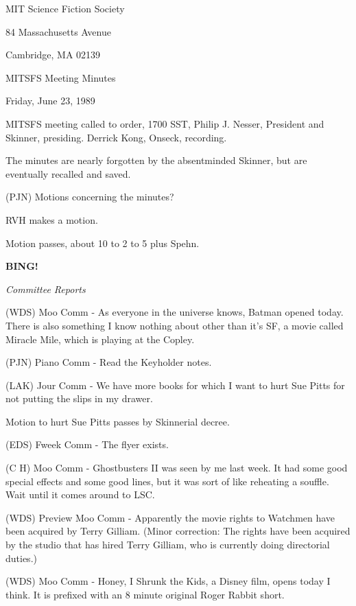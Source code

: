 \documentclass[12pt]{article}
\newcommand{\bing}{{\bf BING!} }
\newcommand{\goto}[1]{\bing \vskip 12pt \centerline{{\em{#1}}}}
\begin{document}
\begin{center}

MIT Science Fiction Society 

84 Massachusetts Avenue

Cambridge, MA 02139

\vspace{12pt}

MITSFS Meeting Minutes 

Friday, June 23, 1989

\end{center}
 
\vspace{18pt}

\setlength{\parskip}{6pt}

\noindent
MITSFS meeting called to order, 1700 SST, Philip J. Nesser, President and Skinner, presiding. Derrick Kong, Onseck, recording.

The minutes are nearly forgotten by the absentminded Skinner, but are eventually recalled and saved.

(PJN) Motions concerning the minutes?

RVH makes a motion.

Motion passes, about 10 to 2 to 5 plus Spehn.

\goto{Committee Reports}

(WDS) Moo Comm - As everyone in the universe knows, Batman opened today. There is also something I know nothing about other than it's SF, a movie called Miracle Mile, which is playing at the Copley.

(PJN) Piano Comm - Read the Keyholder notes.

(LAK) Jour Comm - We have more books for which I want to hurt Sue Pitts for not putting the slips in my drawer.

Motion to hurt Sue Pitts passes by Skinnerial decree.

(EDS) Fweek Comm - The flyer exists.

(C H) Moo Comm - Ghostbusters II was seen by me last week.  It had some good special effects and some good lines, but it was sort of like reheating a souffle.  Wait until it comes around to LSC.

(WDS) Preview Moo Comm - Apparently the movie rights to Watchmen have been acquired by Terry Gilliam.  (Minor correction: The rights have been acquired by the studio that has hired Terry Gilliam, who is currently doing directorial duties.)

(WDS) Moo Comm - Honey, I Shrunk the Kids, a Disney film, opens today I think.  It is prefixed with an 8 minute original Roger Rabbit short. 
\end{document}
